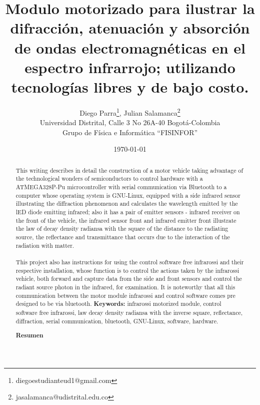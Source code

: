 \documentclass[12]{article}
\title{\bf{Modulo motorizado para ilustrar la difracción, atenuación y absorción de ondas electromagnéticas en el espectro infrarrojo; utilizando tecnologías libres y de bajo costo.}}
\author{Diego Parra\footnote{diegoestudianteud1@gmail.com}, Julian Salamanca\footnote{jasalamanca@udistrital.edu.co} \\
  Universidad Distrital, Calle 3 No 26A-40 Bogotá-Colombia\\
  Grupo de Física e Informática ``FISINFOR''
}
\date{\today}
\def\tablename{Tabla}%
\begin{document}
\renewcommand{\tablename}{Tabla}
\maketitle
\vspace{-0.8cm}
\begin{abstract}

This writing describes in detail the construction of a motor vehicle taking advantage of the technological wonders of semiconductors to control hardware with a ATMEGA328P-Pu microcontroller with serial communication via Bluetooth to a computer whose operating system is GNU-Linux, equipped with a side infrared sensor illustrating the diffraction phenomenon and calculates the wavelength emitted by the lED diode emitting infrared; also it has a pair of emitter sensors - infrared receiver on the front of the vehicle, the infrared sensor front and infrared emitter front illustrate the law of decay density radiansa with the square of the distance to the radiating source, the reflectance and transmittance that occurs due to the interaction of the radiation with matter. \\\\
This project also has instructions for using the control software free infrarossi and their respective installation, whose function is to control the actions taken by the infrarossi vehicle, both forward and capture data from the side and front sensors and control the radiant source photon in the infrared, for examination. It is noteworthy that all this communication between the motor module infrarossi and control software comes pre designed to be via bluetooth.
{\bf{Keywords:}} infrarossi motorized module,  control software free infrarossi, law decay density radiansa with the inverse square, reflectance, diffraction, serial communication, bluetooth, GNU-Linux, software, hardware.
\begin{center}
{\bf{Resumen}} 
\end{center}
  

\end{abstract}
\end{document}
